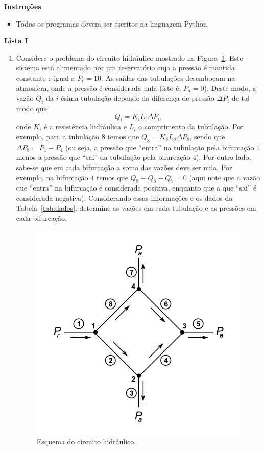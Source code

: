 \documentclass[12pt,a4paper]{article}
\begin{document}
\textbf{Instruções}
\begin{itemize}
 \item Todos os programas devem ser escritos na linguagem Python.
\end{itemize}

\begin{center}
  \textbf{Lista I}
\end{center}

\begin{enumerate}
  \item Considere o problema do circuito hidráulico mostrado na Figura~\ref{fig:tub}. Este sistema está alimentado por um reservatório 
cuja a pressão é mantida constante e igual a $P_r = 10$. As saídas das tubulações desembocam na atmosfera, onde a pressão é 
considerada nula (isto é, $P_a = 0$). Deste modo, a vazão $Q_i$ da $i$-ésima tubulação depende da diferença de pressão $\Delta P_i$ 
de tal modo que $$Q_i = K_iL_i\Delta P_i,$$ onde $K_i$ é a resistência hidráulica e $L_i$ o comprimento da tubulação. Por exemplo, para a 
tubulação $8$ temos que $Q_8 = K_8L_8\Delta P_8$, sendo que $\Delta P_8 = P_1 - P_4$ (ou seja, a pressão que ``entra'' na tubulação pela 
bifurcação $1$ menos a pressão que ``sai'' da tubulação pela bifurcação $4$). Por outro lado, sabe-se que em cada bifurcação a soma das vazões 
deve ser nula. Por exemplo, na bifurcação $4$ temos que $Q_8 - Q_6 - Q_7 = 0$ (aqui note que a vazão que ``entra'' na bifurcação é considerada positiva, 
enquanto que a que ``sai'' é considerada negativa). Considerando essas informações e os dados da Tabela~\ref{tab:dados}, determine as vazões em cada tubulação e as pressões 
em cada bifurcação.

\begin{figure}[!htb]
 \centering
 \includegraphics[scale=0.75]{imagem/tubulacao.png}
 \caption{Esquema do circuito hidráulico.}
 \label{fig:tub}
\end{figure}


\end{enumerate}
\end{document}
